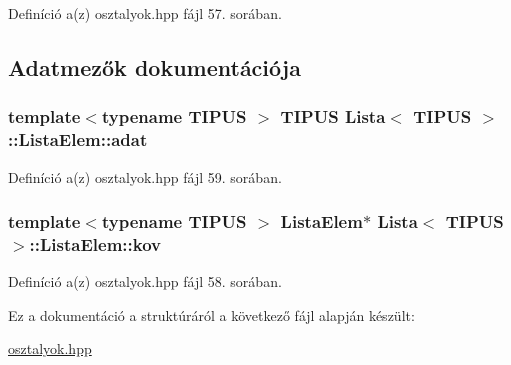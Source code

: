 Definíció a(z) osztalyok.\+hpp fájl 57. sorában.



\subsection{Adatmezők dokumentációja}
\subsubsection[{\texorpdfstring{adat}{adat}}]{\setlength{\rightskip}{0pt plus 5cm}template$<$typename T\+I\+P\+US $>$ T\+I\+P\+US {\bf Lista}$<$ T\+I\+P\+US $>$\+::Lista\+Elem\+::adat}\hypertarget{structLista_1_1ListaElem_af3ebf30581a3eb36c4de08c2a08cd151}{}\label{structLista_1_1ListaElem_af3ebf30581a3eb36c4de08c2a08cd151}


Definíció a(z) osztalyok.\+hpp fájl 59. sorában.

\subsubsection[{\texorpdfstring{kov}{kov}}]{\setlength{\rightskip}{0pt plus 5cm}template$<$typename T\+I\+P\+US $>$ {\bf Lista\+Elem}$\ast$ {\bf Lista}$<$ T\+I\+P\+US $>$\+::Lista\+Elem\+::kov}\hypertarget{structLista_1_1ListaElem_a01e306c007ad116a02b89daae4003e92}{}\label{structLista_1_1ListaElem_a01e306c007ad116a02b89daae4003e92}


Definíció a(z) osztalyok.\+hpp fájl 58. sorában.



Ez a dokumentáció a struktúráról a következő fájl alapján készült\+:\begin{DoxyCompactItemize}
\item 
\hyperlink{osztalyok_8hpp}{osztalyok.\+hpp}\end{DoxyCompactItemize}
